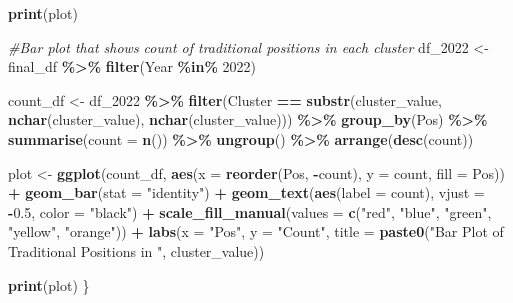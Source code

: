 \documentclass[
]{article}
\newenvironment{Shaded}{\begin{snugshade}}{\end{snugshade}}
\newcommand{\AttributeTok}[1]{\textcolor[rgb]{0.13,0.29,0.53}{#1}}
\newcommand{\CommentTok}[1]{\textcolor[rgb]{0.56,0.35,0.01}{\textit{#1}}}
\newcommand{\FloatTok}[1]{\textcolor[rgb]{0.00,0.00,0.81}{#1}}
\newcommand{\FunctionTok}[1]{\textcolor[rgb]{0.13,0.29,0.53}{\textbf{#1}}}
\newcommand{\NormalTok}[1]{#1}
\newcommand{\OtherTok}[1]{\textcolor[rgb]{0.56,0.35,0.01}{#1}}
\newcommand{\SpecialCharTok}[1]{\textcolor[rgb]{0.81,0.36,0.00}{\textbf{#1}}}
\newcommand{\StringTok}[1]{\textcolor[rgb]{0.31,0.60,0.02}{#1}}
\begin{document}
\begin{Shaded}
\begin{Highlighting}[]
  \FunctionTok{print}\NormalTok{(plot)}
  
  \CommentTok{\#Bar plot that shows count of traditional positions in each cluster}
\NormalTok{  df\_2022 }\OtherTok{\textless{}{-}}\NormalTok{ final\_df }\SpecialCharTok{\%\textgreater{}\%}
    \FunctionTok{filter}\NormalTok{(Year }\SpecialCharTok{\%in\%} \StringTok{\textquotesingle{}2022\textquotesingle{}}\NormalTok{)}
  
\NormalTok{  count\_df }\OtherTok{\textless{}{-}}\NormalTok{ df\_2022 }\SpecialCharTok{\%\textgreater{}\%}
    \FunctionTok{filter}\NormalTok{(Cluster }\SpecialCharTok{==} \FunctionTok{substr}\NormalTok{(cluster\_value, }\FunctionTok{nchar}\NormalTok{(cluster\_value), }\FunctionTok{nchar}\NormalTok{(cluster\_value))) }\SpecialCharTok{\%\textgreater{}\%}
    \FunctionTok{group\_by}\NormalTok{(Pos) }\SpecialCharTok{\%\textgreater{}\%}
    \FunctionTok{summarise}\NormalTok{(}\AttributeTok{count =} \FunctionTok{n}\NormalTok{()) }\SpecialCharTok{\%\textgreater{}\%}
    \FunctionTok{ungroup}\NormalTok{() }\SpecialCharTok{\%\textgreater{}\%}
    \FunctionTok{arrange}\NormalTok{(}\FunctionTok{desc}\NormalTok{(count))}
  
\NormalTok{  plot }\OtherTok{\textless{}{-}} \FunctionTok{ggplot}\NormalTok{(count\_df, }\FunctionTok{aes}\NormalTok{(}\AttributeTok{x =} \FunctionTok{reorder}\NormalTok{(Pos, }\SpecialCharTok{{-}}\NormalTok{count), }\AttributeTok{y =}\NormalTok{ count, }\AttributeTok{fill =}\NormalTok{ Pos)) }\SpecialCharTok{+}
    \FunctionTok{geom\_bar}\NormalTok{(}\AttributeTok{stat =} \StringTok{"identity"}\NormalTok{) }\SpecialCharTok{+}
    \FunctionTok{geom\_text}\NormalTok{(}\FunctionTok{aes}\NormalTok{(}\AttributeTok{label =}\NormalTok{ count), }\AttributeTok{vjust =} \SpecialCharTok{{-}}\FloatTok{0.5}\NormalTok{, }\AttributeTok{color =} \StringTok{"black"}\NormalTok{) }\SpecialCharTok{+}
    \FunctionTok{scale\_fill\_manual}\NormalTok{(}\AttributeTok{values =} \FunctionTok{c}\NormalTok{(}\StringTok{"red"}\NormalTok{, }\StringTok{"blue"}\NormalTok{, }\StringTok{"green"}\NormalTok{, }\StringTok{"yellow"}\NormalTok{, }\StringTok{"orange"}\NormalTok{)) }\SpecialCharTok{+}
    \FunctionTok{labs}\NormalTok{(}\AttributeTok{x =} \StringTok{"Pos"}\NormalTok{, }\AttributeTok{y =} \StringTok{"Count"}\NormalTok{, }\AttributeTok{title =} \FunctionTok{paste0}\NormalTok{(}\StringTok{"Bar Plot of Traditional Positions in "}\NormalTok{, cluster\_value))}
  
  \FunctionTok{print}\NormalTok{(plot)}
\NormalTok{\}}
\end{Highlighting}
\end{Shaded}
\end{document}
